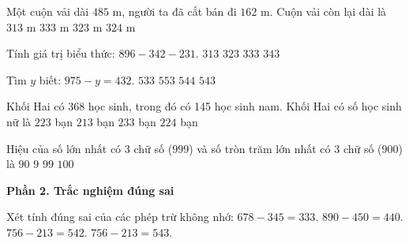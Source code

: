 \begin{ex} %
Một cuộn vải dài $485\text{ m}$, người ta đã cắt bán đi $162\text{ m}$. Cuộn vải còn lại dài là
\choice
{$313\text{ m}$}
{$333\text{ m}$}
{\True $323\text{ m}$}
{$324\text{ m}$}
\end{ex}

\begin{ex} %
Tính giá trị biểu thức: $896 - 342 - 231$.
\choice
{$313$}
{\True $323$}
{$333$}
{$343$}
\end{ex}

\begin{ex} %
Tìm $y$ biết: $975 - y = 432$.
\choice
{$533$}
{$553$}
{$544$}
{\True $543$}
\end{ex}

\begin{ex} %
Khối Hai có 368 học sinh, trong đó có 145 học sinh nam. Khối Hai có số học sinh nữ là
\choice
{\True $223$ bạn}
{$213$ bạn}
{$233$ bạn}
{$224$ bạn}
\end{ex}

\begin{ex} %
Hiệu của số lớn nhất có 3 chữ số ($999$) và số tròn trăm lớn nhất có 3 chữ số ($900$) là
\choice
{$90$}
{$9$}
{\True $99$}
{$100$}
\end{ex}

\textbf{Phần 2. Trắc nghiệm đúng sai}

\begin{ex} %
Xét tính đúng sai của các phép trừ không nhớ:
\choiceTF
{\True $678 - 345 = 333$.}
{\True $890 - 450 = 440$.}
{$756 - 213 = 542$.}
{\True $756 - 213 = 543$.}
\end{ex}

